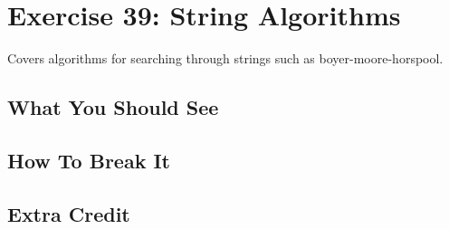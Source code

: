 \chapter{Exercise 39: String Algorithms}

Covers algorithms for searching through strings such as boyer-moore-horspool.


\section{What You Should See}


\section{How To Break It}


\section{Extra Credit}



